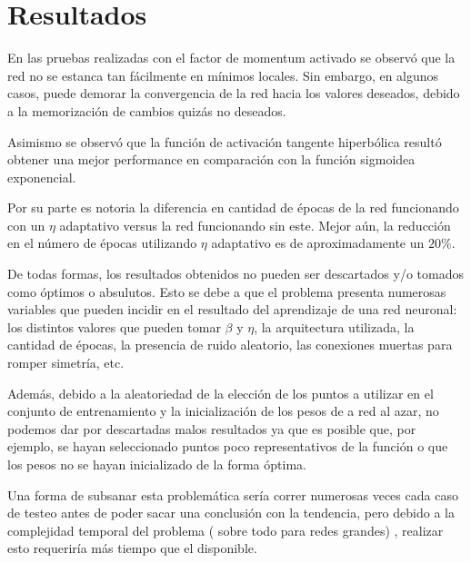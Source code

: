 \documentclass[%
    final,
    reprint,
    notitlepage,
    narroweqnarray,
    inline,
    twoside,
    invited
    ]{ieee}
\begin{document}
\section{Resultados}

\par En las pruebas realizadas con el factor de momentum activado se observó que la red no se estanca tan fácilmente en mínimos locales. Sin embargo, en algunos casos, puede demorar la convergencia de la red hacia los valores deseados, 
debido a la memorización de cambios quizás no deseados.\\

\par Asimismo se observó que la función de activación tangente hiperbólica resultó obtener una mejor performance en comparación con la función sigmoidea exponencial.

\par Por su parte es notoria la diferencia en cantidad de épocas de la red funcionando con un $\eta$ adaptativo versus la red funcionando sin este. Mejor aún, la reducción en el número de épocas utilizando $\eta$ adaptativo es de aproximadamente un $20\%$.\\

\par De todas formas, los resultados obtenidos no pueden ser descartados y/o tomados como óptimos o 
absulutos. Esto se debe a que el problema presenta numerosas variables 
que pueden incidir en el resultado del aprendizaje de una red neuronal: 
los distintos valores que pueden tomar $\beta$ y $\eta$, la arquitectura utilizada, 
la cantidad de épocas, la presencia de ruido aleatorio, las conexiones muertas para romper simetría, etc.\\

\par Además, debido a la aleatoriedad de la elección de los puntos a utilizar en el conjunto de entrenamiento y la inicialización de los pesos de a red al azar, no podemos dar por descartadas malos resultados ya que es posible que, por ejemplo, se hayan seleccionado puntos poco representativos de la función o que los pesos no se hayan inicializado de la forma óptima.
\par Una forma de subsanar esta problemática sería correr numerosas veces cada caso de testeo antes de poder sacar una conclusión con la tendencia, pero debido a la complejidad temporal del problema ( sobre 
todo para redes grandes) , realizar esto requeriría más tiempo que el disponible.
\end{document}
